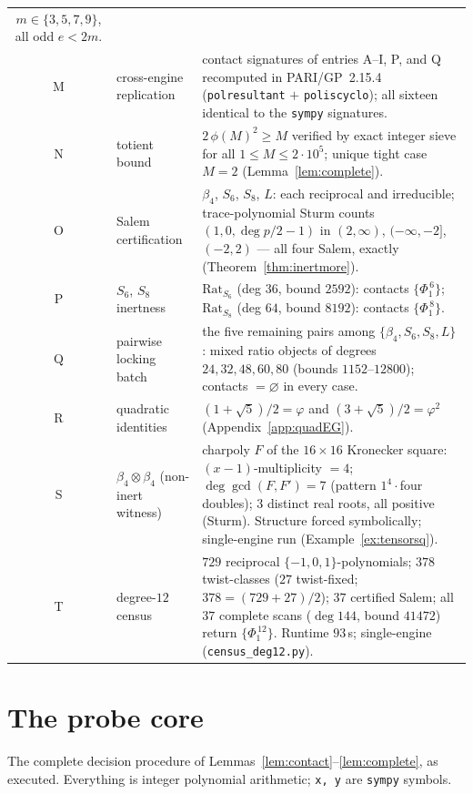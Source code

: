 \documentclass[11pt]{article}
\theoremstyle{plain}
\theoremstyle{definition}
\theoremstyle{remark}
\newcommand{\Rat}{\mathrm{Rat}}
\begin{document}
\begin{center}
\begin{tabular}{clp{9.2cm}}
$m\in\{3,5,7,9\}$, all odd $e<2m$.\\[2pt]
M & cross-engine replication & contact signatures of entries A--I, P, and Q
recomputed in PARI/GP~2.15.4 (\texttt{polresultant} $+$
\texttt{poliscyclo}); all sixteen identical to the \texttt{sympy}
signatures.\\[2pt]
N & totient bound & $2\,\phi(M)^2\ge M$ verified by exact integer sieve for
all $1\le M\le2\cdot10^{5}$; unique tight case $M=2$
(Lemma~\ref{lem:complete}).\\[2pt]
O & Salem certification & $\beta_4$, $S_6$, $S_8$, $L$: each reciprocal and
irreducible; trace-polynomial Sturm counts $(1,0,\deg p/2-1)$ in
$(2,\infty)$, $(-\infty,-2]$, $(-2,2)$ --- all four Salem, exactly
(Theorem~\ref{thm:inertmore}).\\[2pt]
P & $S_6$, $S_8$ inertness & $\Rat_{S_6}$ (deg $36$, bound $2592$): contacts
$\{\Phi_1^{\,6}\}$; $\Rat_{S_8}$ (deg $64$, bound $8192$): contacts
$\{\Phi_1^{\,8}\}$.\\[2pt]
Q & pairwise locking batch & the five remaining pairs among
$\{\beta_4,S_6,S_8,L\}$: mixed ratio objects of degrees $24,32,48,60,80$
(bounds $1152$--$12800$); contacts $=\varnothing$ in every case.\\[2pt]
R & quadratic identities & $(1+\sqrt5)/2=\varphi$ and
$(3+\sqrt5)/2=\varphi^2$ (Appendix~\ref{app:quadEG}).\\[2pt]
S & $\beta_4\otimes\beta_4$ (non-inert witness) & charpoly $F$ of the
$16\times16$ Kronecker square: $(x-1)$-multiplicity $=4$;
$\deg\gcd(F,F')=7$ (pattern $1^4\cdot$four doubles); $3$ distinct real
roots, all positive (Sturm). Structure forced symbolically; single-engine
run (Example~\ref{ex:tensorsq}).\\[2pt]
T & degree-$12$ census & $729$ reciprocal $\{-1,0,1\}$-polynomials; $378$
twist-classes ($27$ twist-fixed; $378=(729+27)/2$); $37$ certified Salem;
all $37$ complete scans ($\deg144$, bound $41472$) return
$\{\Phi_1^{\,12}\}$. Runtime $93$\,s; single-engine
(\texttt{census\_deg12.py}).\\
\hline
\end{tabular}
\end{center}

\section{The probe core}\label{app:probe}

The complete decision procedure of
Lemmas~\ref{lem:contact}--\ref{lem:complete}, as executed. Everything is
integer polynomial arithmetic; \texttt{x, y} are \texttt{sympy} symbols.
\end{document}
